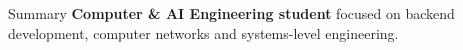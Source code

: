 \begin{rSection}{Summary}
	\textbf{Computer \& AI Engineering student} focused on backend development, computer networks and systems-level engineering.
\end{rSection}